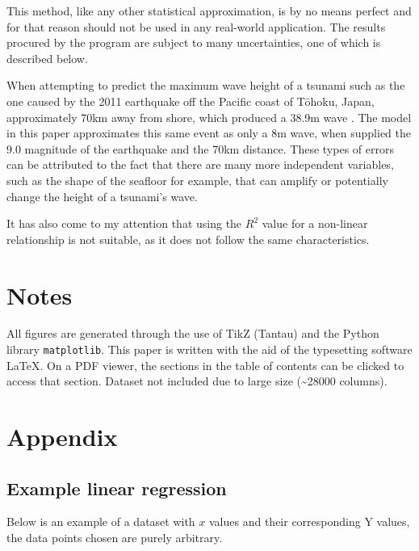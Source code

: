 \documentclass[11pt,letterpaper]{article}
\begin{document}
This method, like any other statistical approximation, is by no means perfect and for that reason should not be used in any real-world application. The results procured by the program are subject to many uncertainties, one of which is described below.

When attempting to predict the maximum wave height of a tsunami such as the one caused by the 2011 earthquake off the Pacific coast of Tōhoku, Japan, approximately 70km away from shore, which produced a 38.9m wave \cite{yomiuri_2011}. The model in this paper approximates this same event as only a 8m wave, when supplied the 9.0 magnitude of the earthquake and the 70km distance. These types of errors can be attributed to the fact that there are many more independent variables, such as the shape of the seafloor for example, that can amplify or potentially change the height of a tsunami's wave.

It has also come to my attention that using the $R^2$ value for a non-linear relationship is not suitable, as it does not follow the same characteristics. 


\newpage
{}


\section*{Notes}
\label{sec:notes}

All figures are generated through the use of TikZ (Tantau) and the Python library \verb|matplotlib|. This paper is written with the aid of the typesetting software \LaTeX. On a PDF viewer, the sections in the table of contents can be clicked to access that section. Dataset not included due to large size (\textasciitilde 28000 columns).

\printbibliography[heading=bibintoc, title=Works Cited]

\appendix
\section{Appendix}
\label{app}
\subsection{Example linear regression}
\label{app:regression}

Below is an example of a dataset with $x$ values and their corresponding Y values, the data points chosen are purely arbitrary.
\end{document}
